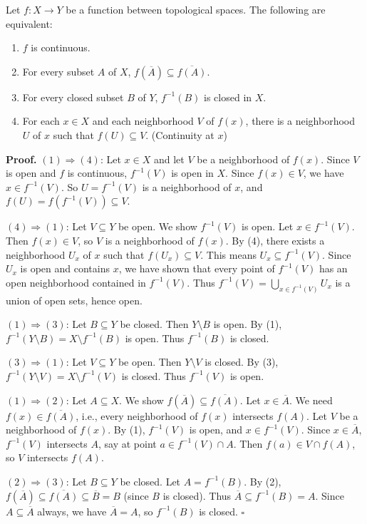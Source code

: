 \documentclass[11pt]{report}
\renewenvironment{proof}[1][Proof]{\noindent\textbf{#1.} }{\hfill$\square$\par\vspace{5pt}}
\begin{document}
\begin{thmbox}
Let $f: X \to Y$ be a function between topological spaces. The following are equivalent:
\begin{enumerate}
    \item $f$ is continuous.
    \item For every subset $A$ of $X$, $f(\overline{A}) \subseteq \overline{f(A)}$.
    \item For every closed subset $B$ of $Y$, $f^{-1}(B)$ is closed in $X$.
    \item For each $x \in X$ and each neighborhood $V$ of $f(x)$, there is a neighborhood $U$ of $x$ such that $f(U) \subseteq V$. (Continuity at $x$)
\end{enumerate}
\end{thmbox}

\begin{proof}
$(1) \Rightarrow (4)$: Let $x \in X$ and let $V$ be a neighborhood of $f(x)$. Since $V$ is open and $f$ is continuous, $f^{-1}(V)$ is open in $X$. Since $f(x) \in V$, we have $x \in f^{-1}(V)$. So $U = f^{-1}(V)$ is a neighborhood of $x$, and $f(U) = f(f^{-1}(V)) \subseteq V$.

$(4) \Rightarrow (1)$: Let $V \subseteq Y$ be open. We show $f^{-1}(V)$ is open. Let $x \in f^{-1}(V)$. Then $f(x) \in V$, so $V$ is a neighborhood of $f(x)$. By (4), there exists a neighborhood $U_x$ of $x$ such that $f(U_x) \subseteq V$. This means $U_x \subseteq f^{-1}(V)$. Since $U_x$ is open and contains $x$, we have shown that every point of $f^{-1}(V)$ has an open neighborhood contained in $f^{-1}(V)$. Thus $f^{-1}(V) = \bigcup_{x \in f^{-1}(V)} U_x$ is a union of open sets, hence open.

$(1) \Rightarrow (3)$: Let $B \subseteq Y$ be closed. Then $Y \setminus B$ is open. By (1), $f^{-1}(Y \setminus B) = X \setminus f^{-1}(B)$ is open. Thus $f^{-1}(B)$ is closed.

$(3) \Rightarrow (1)$: Let $V \subseteq Y$ be open. Then $Y \setminus V$ is closed. By (3), $f^{-1}(Y \setminus V) = X \setminus f^{-1}(V)$ is closed. Thus $f^{-1}(V)$ is open.

$(1) \Rightarrow (2)$: Let $A \subseteq X$. We show $f(\overline{A}) \subseteq \overline{f(A)}$. Let $x \in \overline{A}$. We need $f(x) \in \overline{f(A)}$, i.e., every neighborhood of $f(x)$ intersects $f(A)$. Let $V$ be a neighborhood of $f(x)$. By (1), $f^{-1}(V)$ is open, and $x \in f^{-1}(V)$. Since $x \in \overline{A}$, $f^{-1}(V)$ intersects $A$, say at point $a \in f^{-1}(V) \cap A$. Then $f(a) \in V \cap f(A)$, so $V$ intersects $f(A)$.

$(2) \Rightarrow (3)$: Let $B \subseteq Y$ be closed. Let $A = f^{-1}(B)$. By (2), $f(\overline{A}) \subseteq \overline{f(A)} \subseteq \overline{B} = B$ (since $B$ is closed). Thus $\overline{A} \subseteq f^{-1}(B) = A$. Since $A \subseteq \overline{A}$ always, we have $\overline{A} = A$, so $f^{-1}(B)$ is closed.
\end{proof}
\end{document}
